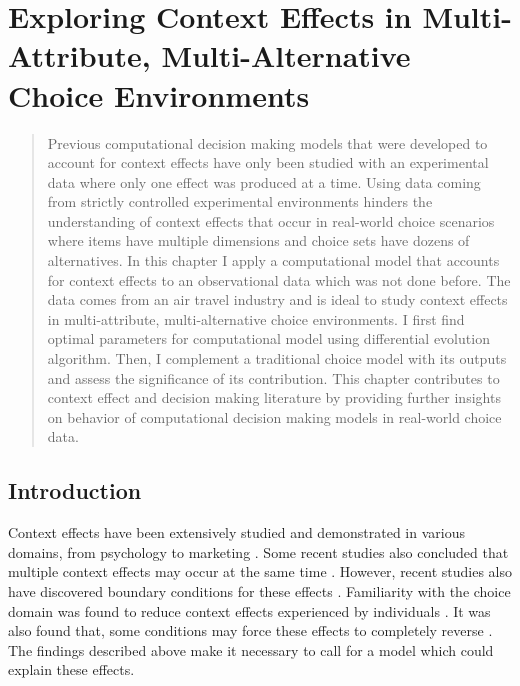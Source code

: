 \documentclass[a4paper,12pt]{article}
\begin{document}
\newpage

\section{Exploring Context Effects in Multi-Attribute, Multi-Alternative Choice Environments}\label{chapter:simulationStudy}
\begin{abstract}
    
    Previous computational decision making models that were developed to account for context effects have only been
    studied with an experimental data where only one effect was produced at a time. Using data coming from strictly controlled experimental environments
    hinders the understanding of context effects that occur in real-world choice scenarios where items have multiple dimensions and choice sets have dozens of alternatives. In this chapter
    I apply a computational model that accounts for context effects to an observational data which was not done before. The data comes from an air travel industry and is ideal to study context effects in multi-attribute, multi-alternative choice environments. I first find optimal parameters for computational model using differential evolution algorithm. Then, I complement a traditional choice model with its outputs and assess the significance of its contribution. This chapter contributes to context effect and decision making literature by providing further insights on behavior of computational decision making models in real-world choice data.
    
\end{abstract}

\newpage

\subsection{Introduction}

Context effects have been extensively studied and demonstrated in various domains, from psychology to marketing \citep{herne1997decoy, soltani2012range, truebloodEtAl13, frederickEtAl14, evangelidisEtAl18, wuConsguner20}. Some recent studies also concluded that multiple context effects may occur at the same time \citep{berkowitsch2014rigorously, noguchi2014attraction}. However, recent studies also have discovered boundary conditions for these effects \citep{liew2016appropriacy, spektor2018good, spektor2019similarity}. Familiarity with the choice domain was found to reduce context effects experienced by individuals \citep{kim2005attraction, sheng2005understanding}.  It was also found that, some conditions may force these effects to completely reverse \citep{cataldo2019comparison}. The findings described above make it necessary to call for a model which could explain these effects.
\end{document}
